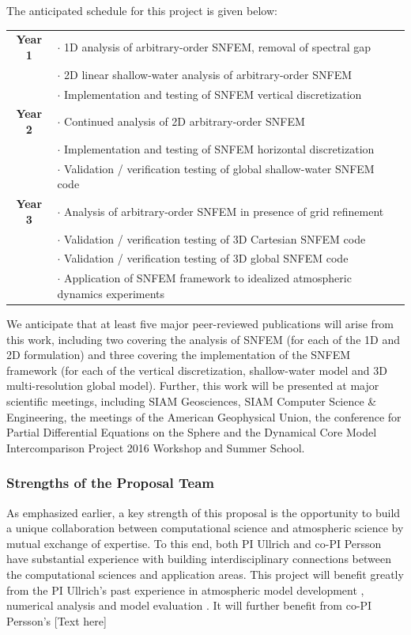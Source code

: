 \documentclass[11pt]{article}
\begin{document}
The anticipated schedule for this project is given below:

\begin{tabularx}{\textwidth}{cX}
\hline
\textbf{Year 1} & $\cdot$ 1D analysis of arbitrary-order SNFEM, removal of spectral gap \\
& $\cdot$ 2D linear shallow-water analysis of arbitrary-order SNFEM \\
& $\cdot$ Implementation and testing of SNFEM vertical discretization \\
\hline
\textbf{Year 2} & $\cdot$ Continued analysis of 2D arbitrary-order SNFEM \\
& $\cdot$ Implementation and testing of SNFEM horizontal discretization \\
& $\cdot$ Validation / verification testing of global shallow-water SNFEM code \\
\hline
\textbf{Year 3} & $\cdot$ Analysis of arbitrary-order SNFEM in presence of grid refinement \\
& $\cdot$ Validation / verification testing of 3D Cartesian SNFEM code \\
& $\cdot$ Validation / verification testing of 3D global SNFEM code \\
& $\cdot$ Application of SNFEM framework to idealized atmospheric dynamics experiments \\
\hline
\end{tabularx}

We anticipate that at least five major peer-reviewed publications will arise from this work, including two covering the analysis of SNFEM (for each of the 1D and 2D formulation) and three covering the implementation of the SNFEM framework (for each of the vertical discretization, shallow-water model and 3D multi-resolution global model). Further, this work will be presented at major scientific meetings, including SIAM Geosciences, SIAM Computer Science \& Engineering, the meetings of the American Geophysical Union, the conference for Partial Differential Equations on the Sphere and the Dynamical Core Model Intercomparison Project 2016 Workshop and Summer School.

\subsubsection{Strengths of the Proposal Team}

As emphasized earlier, a key strength of this proposal is the opportunity to build a unique collaboration between computational science and atmospheric science by mutual exchange of expertise.  To this end, both PI Ullrich and co-PI Persson have substantial experience with building interdisciplinary connections between the computational sciences and application areas.  This project will benefit greatly from the PI Ullrich's past experience in atmospheric model development  \cite{PHLRDNPAU2010JCP, PAUCJBVL2010JCP, PHLPAURDN2011SPRINGER, PAUCJ2012MWR, PAUMN2012QJRMS, PAUCJ2012JCP, guba2014viscosity, ullrich2014understanding, ullrich2014global}, numerical analysis \cite{ullrich2011analysis, ullrich2012considerations} and model evaluation \cite{DCMIP2012TESTCASES, ullrich2014proposed, kent2013dynamical, ullrich2014baroclinic}.  It will further benefit from co-PI Persson's {\color{red}[Text here]}
\end{document}
